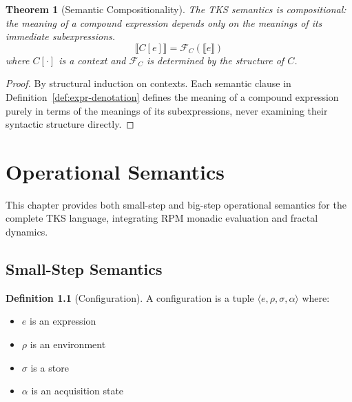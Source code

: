 \documentclass[11pt,twoside,openright]{book}
\theoremstyle{definition}
\newtheorem{definition}{Definition}[chapter]
\theoremstyle{plain}
\newtheorem{theorem}[definition]{Theorem}
\theoremstyle{remark}
\begin{document}
\begin{theorem}[Semantic Compositionality]
\label{thm:compositionality}
The TKS semantics is compositional: the meaning of a compound expression depends only on the meanings of its immediate subexpressions.
\[
\llbracket C[e] \rrbracket = \mathcal{F}_C(\llbracket e \rrbracket)
\]
where $C[\cdot]$ is a context and $\mathcal{F}_C$ is determined by the structure of $C$.
\end{theorem}

\begin{proof}
By structural induction on contexts. Each semantic clause in Definition~\ref{def:expr-denotation} defines the meaning of a compound expression purely in terms of the meanings of its subexpressions, never examining their syntactic structure directly.
\end{proof}

\chapter{Operational Semantics}
\label{ch:operational}

This chapter provides both small-step and big-step operational semantics for the complete TKS language, integrating RPM monadic evaluation and fractal dynamics.

\section{Small-Step Semantics}

\begin{definition}[Configuration]
\label{def:configuration}
A configuration is a tuple $\langle e, \rho, \sigma, \alpha \rangle$ where:
\begin{itemize}
\item $e$ is an expression
\item $\rho$ is an environment
\item $\sigma$ is a store
\item $\alpha$ is an acquisition state
\end{itemize}
\end{definition}
\end{document}
